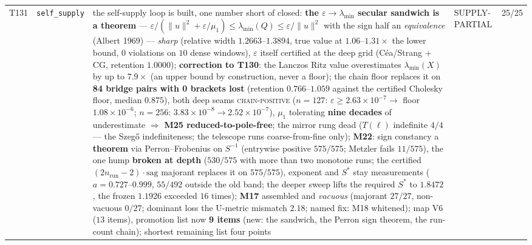 \documentclass[11pt,a4paper]{article}
\begin{document}
{\begin{xltabular}{\linewidth}{@{}p{0.95cm} >{\raggedright\arraybackslash}p{3.1cm} Y >{\raggedright\scriptsize\arraybackslash}p{3.35cm} p{1.15cm}@{}}
T131 & \texttt{\scriptsize self\_\allowbreak supply} & the self-supply loop is built, one number short of closed: \textbf{the $\varepsilon\to\lambda_{\min}$ secular sandwich is a theorem} --- $\varepsilon/(\|u\|^{2}+\varepsilon/\mu_{1})\le\lambda_{\min}(Q)\le\varepsilon/\|u\|^{2}$ with the sign half an \emph{equivalence} (Albert 1969) --- \emph{sharp} (relative width $1.2663$--$1.3894$, true value at $1.06$--$1.31\times$ the lower bound, $0$ violations on $10$ dense windows), $\varepsilon$ itself certified at the deep grid (C\'ea/Strang + CG, retention $1.0000$); \textbf{correction to T130}: the Lanczos Ritz value overestimates $\lambda_{\min}(X)$ by up to $7.9\times$ (an upper bound by construction, never a floor); the chain floor replaces it on \textbf{84 bridge pairs with 0 brackets lost} (retention $0.766$--$1.059$ against the certified Cholesky floor, median $0.875$), both deep seams \textsc{chain-positive} ($n=127$: $\varepsilon\ge2.63\times10^{-7}\to$ floor $1.08\times10^{-6}$; $n=256$: $3.83\times10^{-8}\to2.52\times10^{-7}$), $\mu_{1}$ tolerating \textbf{nine decades} of underestimate $\Rightarrow$ \textbf{M25 reduced-to-pole-free}; the mirror rung dead ($T(\ell)$ indefinite $4/4$ --- the Szeg\H{o} indefiniteness; the telescope runs coarse-from-fine only); \textbf{M22}: sign constancy a \textbf{theorem} via Perron--Frobenius on $S^{-1}$ (entrywise positive $575/575$; Metzler fails $11/575$), the one hump \textbf{broken at depth} ($530/575$ with more than two monotone runs; the certified $(2n_{\mathrm{run}}-2)\cdot\mathrm{sag}$ majorant replaces it on $575/575$), exponent and $S^{*}$ stay measurements ($a=0.727$--$0.999$, $55/492$ outside the old band; the deeper sweep lifts the required $S^{*}$ to $1.8472$, the frozen $1.1926$ exceeded $16$ times); \textbf{M17} assembled and \emph{vacuous} (majorant $27/27$, non-vacuous $0/27$; dominant loss the U-metric mismatch $2.18$; named fix: M18 whitened); map V6 ($13$ items), promotion list now \textbf{9 items} (new: the sandwich, the Perron sign theorem, the run-count chain); shortest remaining list four points & SUPPLY-PARTIAL & 25/25\\

\end{xltabular}}
\end{document}
